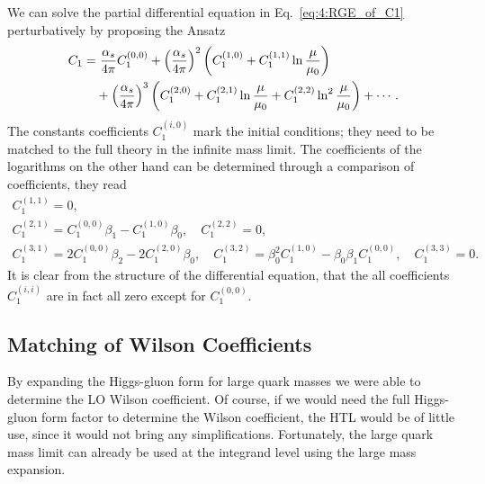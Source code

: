 We can solve the partial differential equation in Eq.~\eqref{eq:4:RGE_of_C1} perturbatively by proposing the Ansatz
\begin{equation}
\begin{split}
C_1 =  &\ \frac{\alpha_s}{4 \pi} C_1^{(0,0)} + \left(\frac{\alpha_s}{4 \pi} \right)^2 \left(C_1^{(1,0)} + C_1^{(1, 1)} \ln \frac{\mu}{\mu_0} \right) \\
&+ \left(\frac{\alpha_s}{4 \pi} \right)^3 \left(C_1^{(2, 0)} + C_1^{(2, 1)} \ln \frac{\mu}{\mu_0} + C_1^{(2, 2)} \ln^2 \frac{\mu}{\mu_0} \right) + \cdots.
\end{split}
\end{equation}
The constants coefficients $C_1^{(i, 0)}$ mark the initial conditions; they need to be matched to the full theory in the infinite mass limit. The coefficients of the logarithms on the other hand can be determined through a comparison of coefficients, they read
\begin{equation}
\begin{gathered}
C_1^{(1,1)} = 0, \\
C_1^{(2,1)} = C_1^{(0,0)} \beta_1 - C_1^{(1, 0)} \beta_0, \quad C_1^{(2, 2)} = 0, \\
C_1^{(3,1)} = 2 C_1^{(0,0)} \beta_2 - 2 C_1^{(2,0)} \beta_0, \quad C_1^{(3,2)} = \beta_0^2 C_1^{(1,0)} - \beta_0 \beta_1 C_1^{(0,0)}, \quad C_1^{(3, 3)} = 0.
\end{gathered}
\end{equation}
It is clear from the structure of the differential equation, that the all coefficients $C_1^{(i, i)}$ are in fact all zero except for $C_1^{(0,0)}$.

\subsection{Matching of Wilson Coefficients} \label{subsec:4:matching_of_wilson_coefficients}
By expanding the Higgs-gluon form for large quark masses we were able to determine the \acs{LO} Wilson coefficient. Of course, if we would need the full Higgs-gluon form factor to determine the Wilson coefficient, the \acs{HTL} would be of little use, since it would not bring any simplifications. Fortunately, the large quark mass limit can already be used at the integrand level using the large mass expansion.

